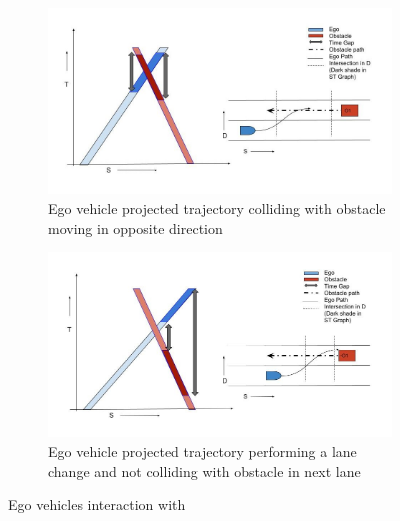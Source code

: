 \begin{figure}
	\centering
	\begin{subfigure}{.515\textwidth}
		\centering
		\includegraphics[width=1.0\textwidth]{Images/concept/dynamic_opposite_collision.jpg}
		\caption{Ego vehicle projected trajectory colliding with obstacle moving in opposite direction}
		\label{dynamic_opp1}
	\end{subfigure}%
	\begin{subfigure}{.485\textwidth}
		\centering
		\includegraphics[width=1.0\textwidth]{Images/concept/dynamic_opposite_nocollision.jpg}
		\caption{Ego vehicle projected trajectory performing a lane change and not colliding with obstacle in next lane}
		\label{dynamic_opp2}
	\end{subfigure}
	\caption{Ego vehicles interaction with }
	\label{dynamic_opp}
\end{figure}
\fi

